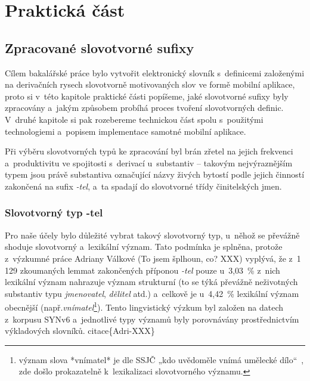 \part{Praktická část}

\hypertarget{zpracovanuxe9-slovotvornuxe9-sufixy}{%
\chapter{Zpracované slovotvorné
sufixy}\label{zpracovanuxe9-slovotvornuxe9-sufixy}}

Cílem bakalářské práce bylo vytvořit elektronický slovník s~definicemi
založenými na derivačních rysech slovotvorně motivovaných slov ve formě
mobilní aplikace, proto si v~této kapitole praktické části popíšeme,
jaké slovotvorné sufixy byly zpracovány a~jakým způsobem probíhá proces
tvoření slovotvorných definic. V~druhé kapitole si pak rozebereme
technickou část spolu s~použitými technologiemi a~popisem implementace
samotné mobilní aplikace.

Při výběru slovotvorných typů ke zpracování byl brán zřetel na jejich
frekvenci a~produktivitu ve spojitosti s~derivací u~substantiv --
takovým nejvýraznějším typem jsou právě substantiva označující názvy
živých bytostí podle jejich činností zakončená na sufix \emph{-tel},
a~ta spadají do slovotvorné třídy činitelských jmen.
\parencite[17]{dokulil67}

\hypertarget{slovotvornuxfd-typ--tel}{%
\section{Slovotvorný typ -tel}\label{slovotvornuxfd-typ--tel}}

Pro naše účely bylo důležité vybrat takový slovotvorný typ, u~něhož se
převážně shoduje slovotvorný a~lexikální význam. Tato podmínka je
splněna, protože z~výzkumné práce Adriany Válkové (To jsem šplhoun, co?
XXX) vyplývá, že z~1 129 zkoumaných lemmat zakončených příponou
\emph{-tel} pouze u~3,03~\% z~nich lexikální význam nahrazuje význam
strukturní (to se týká převážně neživotných substantiv typu
\emph{jmenovatel}, \emph{dělitel} atd.) a~celkově je u~4,42~\% lexikální
význam obecnější
(např.\emph{vnímatel}\footnote{význam slova *vnímatel* je dle SSJČ „kdo uvědoměle vnímá umělecké dílo“~\parencite{ssjc}, zde došlo prokazatelně k~lexikalizaci slovotvorného významu.}).
Tento lingvistický výzkum byl založen na datech z~korpusu SYNv6
a~jednotlivé typy významů byly porovnávány prostřednictvím výkladových
slovníků. citace\{Adri-XXX\}


